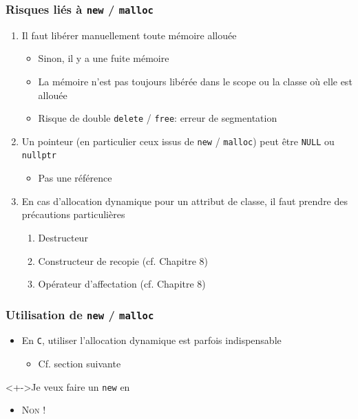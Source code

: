 \begin{frame}
\frametitle{Risques liés à \texttt{new} / \texttt{malloc}}
\begin{enumerate}[<+->]
\item Il faut libérer manuellement toute mémoire allouée
	\begin{itemize}
	\item Sinon, il y a une fuite mémoire
	\item La mémoire n'est pas toujours libérée dans le scope ou la classe où elle est allouée
	\item Risque de double \lstinline|delete| / \texttt{free}: erreur de segmentation
	\end{itemize}
\item Un pointeur (en particulier ceux issus de \lstinline|new| / \texttt{malloc}) peut être \lstinline|NULL| ou \lstinline|nullptr|
	\begin{itemize}
	\item Pas une référence
	\end{itemize}
\item En cas d'allocation dynamique pour un attribut de classe, il faut prendre des précautions particulières
	\begin{enumerate}
	\item Destructeur
	\item Constructeur de recopie (cf. Chapitre 8)
	\item Opérateur d'affectation (cf. Chapitre 8)
	\end{enumerate}
\end{enumerate}
\end{frame}

\begin{frame}
\frametitle{Utilisation de \texttt{new} / \texttt{malloc}}
\begin{itemize}[<+->]
\item En \texttt{C}, utiliser l'allocation dynamique est parfois indispensable
	\begin{itemize}
	\item Cf. section suivante
	\end{itemize}
\end{itemize}
\begin{alertblock}<+->{Je veux faire un \texttt{new} en \cpp}
	\begin{itemize}[<+->]
	\item \textcolor{esi-red}{\Huge{\textsc{Non !}}}
	\end{itemize}
\end{alertblock}
\end{frame}

